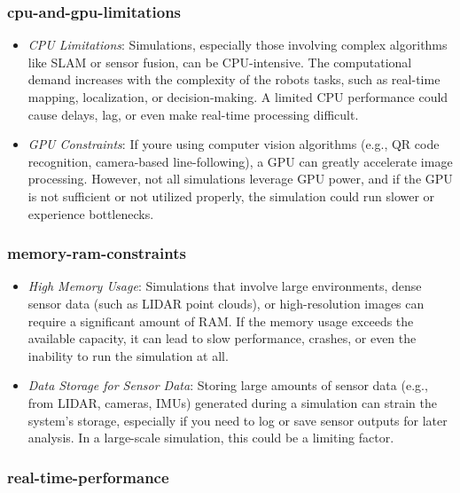 \documentclass[../../main]{subfiles}
\begin{document}
    \subsubsection{cpu-and-gpu-limitations}

    \begin{itemize}
    \item
      \emph{CPU Limitations}: Simulations, especially those involving
      complex algorithms like SLAM or sensor fusion, can be CPU-intensive.
      The computational demand increases with the complexity of the
      robot\textquotesingle s tasks, such as real-time mapping,
      localization, or decision-making. A limited CPU performance could
      cause delays, lag, or even make real-time processing difficult.
    \item
      \emph{GPU Constraints}: If you\textquotesingle re using computer
      vision algorithms (e.g., QR code recognition, camera-based
      line-following), a GPU can greatly accelerate image processing.
      However, not all simulations leverage GPU power, and if the GPU is not
      sufficient or not utilized properly, the simulation could run slower
      or experience bottlenecks.
    \end{itemize}
    
    \subsubsection{memory-ram-constraints}   
    \begin{itemize}
    \item
      \emph{High Memory Usage}: Simulations that involve large
      environments, dense sensor data (such as LIDAR point clouds), or
      high-resolution images can require a significant amount of RAM. If the
      memory usage exceeds the available capacity, it can lead to slow
      performance, crashes, or even the inability to run the simulation at
      all.
    \item
      \emph{Data Storage for Sensor Data}: Storing large amounts of sensor
      data (e.g., from LIDAR, cameras, IMUs) generated during a simulation
      can strain the system's storage, especially if you need to log or save
      sensor outputs for later analysis. In a large-scale simulation, this
      could be a limiting factor.
    \end{itemize}
    
    \subsubsection{real-time-performance}
    
\end{document}
